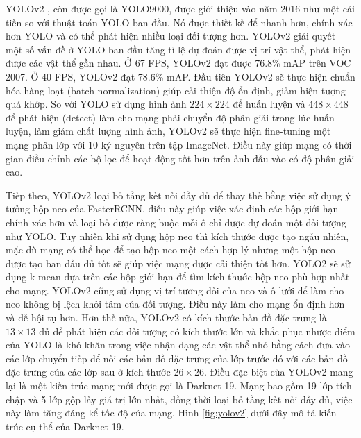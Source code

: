 \documentclass[../the.tex]{subfiles}
\begin{document}
{\fontsize{13}{12} \selectfont

	YOLOv2 \cite{redmon2016yolo9000}, còn được gọi là YOLO9000, được giới thiệu vào năm 2016 như một cải tiến so với thuật toán YOLO ban đầu. Nó được thiết kế để nhanh hơn, chính xác hơn YOLO và có thể phát hiện nhiều loại đối tượng hơn.
	YOLOv2 giải quyết một số vấn đề ở YOLO ban đầu tăng tỉ lệ dự đoán được vị trí vật thể, phát hiện được các vật thể gần nhau.
	Ở 67 FPS, YOLOv2 đạt được 76.8\% mAP trên VOC 2007. Ở 40 FPS, YOLOv2 đạt 78.6\% mAP.
	Đầu tiên YOLOv2 sẽ thực hiện chuẩn hóa hàng loạt (batch normalization) giúp cải thiện độ ổn định, giảm hiện tượng quá khớp. So với YOLO sử dụng hình ảnh $224 \times 224$ để huấn luyện và $448 \times 448$
	để phát hiện (detect)  làm cho mạng phải chuyển độ phân giải trong lúc huấn luyện, làm giảm chất lượng hình ảnh, YOLOv2 sẽ thực hiện fine-tuning một mạng phân lớp với 10 kỷ nguyên trên tập ImageNet.
	Điều này giúp mạng có thời gian điều chỉnh các bộ lọc để hoạt động tốt hơn trên ảnh đầu vào có độ phân giải cao.

}

\bigskip

{\fontsize{13}{12} \selectfont

	Tiếp theo, YOLOv2 loại bỏ tầng kết nối đầy đủ để thay thế bằng việc sử dụng ý tưởng hộp neo của FasterRCNN,
	điều này giúp việc xác định các hộp giới hạn chính xác hơn và loại bỏ được ràng buộc mỗi ô chỉ được dự đoán một đối tượng như YOLO.
	Tuy nhiên khi sử dụng hộp neo thì kích thước được tạo ngẫu nhiên, mặc dù mạng có thể học để tạo hộp neo một cách hợp lý nhưng một hộp neo được tạo
	ban đầu đủ tốt sẽ giúp việc mạng được cải thiện tốt hơn. YOLO2 sẽ sử dụng k-mean dựa trên các hộp giới hạn để tìm kích thước hộp neo phù hợp nhất cho mạng.
	YOLOv2 cũng sử dụng vị trí tương
	đối của neo và ô lưới để làm cho neo không bị lệch khỏi tâm của đối tượng. Điều này
	làm cho mạng ổn định hơn và dễ hội tụ hơn. Hơn thế nữa, YOLOv2 có kích thước bản đồ đặc trưng là $13 \times 13$ đủ để phát hiện các đối tượng có kích thước lớn và khắc phục nhược điểm của YOLO là khó khăn trong việc nhận dạng các vật thể nhỏ
	bằng cách đưa vào các lớp chuyển tiếp để nối các bản đồ đặc trưng của lớp trước đó với các bản đồ đặc trưng của các lớp sau ở kích thước $26
		\times 26$. Điều đặc biệt của YOLOv2 mang lại là một kiến trúc mạng mới được gọi là Darknet-19.
	Mạng bao gồm 19 lớp tích chập và 5 lớp gộp lấy giá trị lớn nhất, đồng thời loại bỏ tầng kết nối đầy đủ, việc này làm tăng đáng kể tốc độ của mạng.
	Hình \ref{fig:yolov2} dưới đây mô tả kiến trúc cụ thể của Darknet-19.

}
\end{document}
